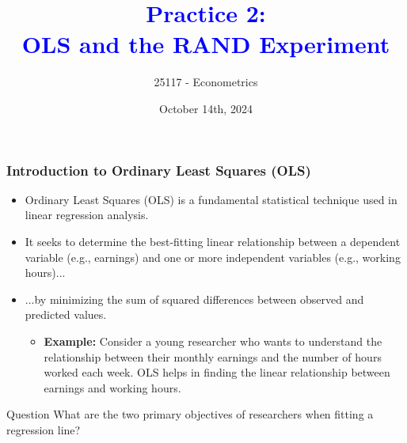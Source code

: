 \documentclass[notes,10pt, aspectratio=169]{beamer}
\title[]{\textcolor{blue}{Practice 2:\\OLS and the RAND Experiment}}
\author{25117 - Econometrics}
\institute[shortinst]{Universitat Pompeu Fabra}
\date{October 14th, 2024}
\begin{document}

\begin{frame}[plain]
\maketitle
\end{frame}

\begin{frame}
\frametitle{Introduction to Ordinary Least Squares (OLS)}
\begin{itemize}
    \item Ordinary Least Squares (OLS) is a fundamental statistical technique used in linear regression analysis.\vspace{1em}
    \item It seeks to determine the best-fitting linear relationship between a dependent variable (e.g., earnings) and one or more independent variables (e.g., working hours)...\vspace{1em}
    \item ...by minimizing the sum of squared differences between observed and predicted values.\vspace{1em}
    \begin{itemize}
        \item \textbf{Example:} Consider a young researcher who wants to understand the relationship between their monthly earnings and the number of hours worked each week. OLS helps in finding the linear relationship between earnings and working hours.\vspace{1em}
    \end{itemize}
\end{itemize}

\begin{exampleblock}{Question}
    What are the two primary objectives of researchers when fitting a regression line?
\end{exampleblock}
\end{frame}
\end{document}

